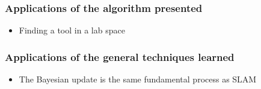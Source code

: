 \begin{frame}
  \frametitle{Applications of the algorithm presented}
  \begin{itemize}
  \item Finding a tool in a lab space
  \end{itemize}
\end{frame}

\begin{frame}
  \frametitle{Applications of the general techniques learned}
  \begin{itemize}
    \item The Bayesian update is the same fundamental process as SLAM
  \end{itemize}
\end{frame}